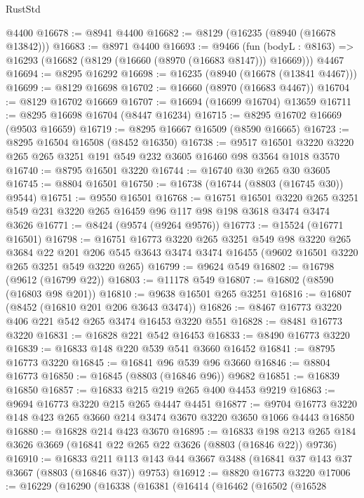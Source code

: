 \begin{lexlean}{RustStd}
\begin{coremodule}
    @4400
@16678 := @8941 @4400
@16682 := @8129 (@16235 (@8940 (@16678 @13842)))
@16683 := @8971 @4400
@16693 := @9466
    (fun (bodyL : @8163) => @16293 (@16682 (@8129 (@16660 (@8970 (@16683 @8147))) @16669)))
    @4467
@16694 := @8295 @16292
@16698 := @16235 (@8940 (@16678 (@13841 @4467)))
@16699 := @8129 @16698
@16702 := @16660 (@8970 (@16683 @4467))
@16704 := @8129 @16702 @16669
@16707 := @16694 (@16699 @16704) @13659
@16711 := @8295 @16698 @16704 (@8447 @16234)
@16715 := @8295 @16702 @16669 (@9503 @16659)
@16719 := @8295 @16667 @16509 (@8590 @16665)
@16723 := @8295 @16504 @16508 (@8452 @16350)
@16738 := @9517 @16501 @3220 @3220 @265 @265 @3251 @191 @549 @232 @3605 @16460 @98 @3564 @1018 @3570
@16740 := @8795 @16501 @3220
@16744 := @16740 @30 @265 @30 @3605
@16745 := @8804 @16501
@16750 := @16738 (@16744 (@8803 (@16745 @30)) @9544)
@16751 := @9550 @16501
@16768 := @16751
    @16501
    @3220
    @265
    @3251
    @549
    @231
    @3220
    @265
    @16459
    @96
    @117
    @98
    @198
    @3618
    @3474
    @3474
    @3626
@16771 := @8424 (@9574 (@9264 @9576))
@16773 := @15524 (@16771 @16501)
@16798 := @16751
    @16773
    @3220
    @265
    @3251
    @549
    @98
    @3220
    @265
    @3684
    @22
    @201
    @206
    @545
    @3643
    @3474
    @3474
    @16455
    (@9602 @16501 @3220 @265 @3251 @549 @3220 @265)
@16799 := @9624 @549
@16802 := @16798 (@9612 (@16799 @22))
@16803 := @11178 @549
@16807 := @16802 (@8590 (@16803 @98 @201))
@16810 := @9638 @16501 @265 @3251
@16816 := @16807 (@8452 (@16810 @201 @206 @3643 @3474))
@16826 := @8467 @16773 @3220 @406 @221 @542 @265 @3474 @16453 @3220 @551
@16828 := @8481 @16773 @3220
@16831 := @16828 @221 @542 @16453
@16833 := @8490 @16773 @3220
@16839 := @16833 @148 @220 @539 @541 @3660 @16452
@16841 := @8795 @16773 @3220
@16845 := @16841 @96 @539 @96 @3660
@16846 := @8804 @16773
@16850 := @16845 (@8803 (@16846 @96)) @9682
@16851 := @16839 @16850
@16857 := @16833 @215 @219 @265 @400 @4453 @9219
@16863 := @9694 @16773 @3220 @215 @265 @4447 @4451
@16877 := @9704 @16773 @3220 @148 @423 @265 @3660 @214 @3474 @3670 @3220 @3650 @1066 @4443 @16850
@16880 := @16828 @214 @423 @3670
@16895 := @16833
    @198
    @213
    @265
    @184
    @3626
    @3669
    (@16841 @22 @265 @22 @3626 (@8803 (@16846 @22)) @9736)
@16910 := @16833
    @211
    @113
    @143
    @44
    @3667
    @3488
    (@16841 @37 @143 @37 @3667 (@8803 (@16846 @37)) @9753)
@16912 := @8820 @16773 @3220
@17006 := @16229
    (@16290
      (@16338
        (@16381
          (@16414
            (@16462
              (@16502
                (@16528

\end{coremodule}
\end{lexlean}
